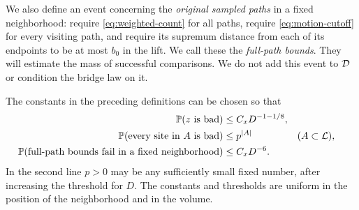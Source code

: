 We also define an event concerning the \emph{original sampled paths} in
a fixed neighborhood: require \eqref{eq:weighted-count} for all paths,
require \eqref{eq:motion-cutoff} for every visiting path, and require its
supremum distance from each of its endpoints to be at most $b_0$ in the
lift.  We call these the \emph{full-path bounds}.  They will estimate the
mass of successful comparisons.  We do not add this event to $\mathcal D$ or
condition the bridge law on it.

\begin{proposition}\label{prop:good-data}
The constants in the preceding definitions can be chosen so that
\begin{equation}\label{eq:good-prob}
\begin{aligned}
 \mathbb P(z\text{ is bad})&\le C_xD^{-1-1/8},\\
 \mathbb P(\text{every site in }A\text{ is bad})&\le p^{|A|}
                 &&(A\subset\mathcal L),\\
 \mathbb P(\text{full-path bounds fail in a fixed neighborhood})
                  &\le C_xD^{-6}.
\end{aligned}
\end{equation}
In the second line $p>0$ may be any sufficiently small fixed number,
after increasing the threshold for $D$.  The constants and thresholds
are uniform in the position of the neighborhood and in the volume.
\end{proposition}

